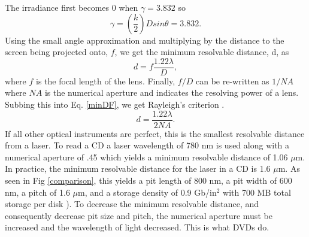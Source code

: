 \documentclass[ notitlepage, numerical, 11pt]{revtex4-1} %
\begin{document}
The irradiance first becomes 0 when $\gamma = 3.832$ \cite{optics} so 
\begin{equation}
\gamma = (\frac{k}{2})Dsin\theta = 3.832.
\label{gamma}
\end{equation}  
Using the small angle approximation and multiplying by the distance to the screen being projected onto, $f$, we get the minimum resolvable distance, d, as
\begin{equation}
d = f\frac{1.22\lambda}{D},
\label{minDF}
\end{equation}
where $f$ is the focal length of the lens. Finally, $f/D$ can be re-written as $1/NA$ where $NA$ is the numerical aperture and indicates the resolving power of a lens. Subbing this into Eq. \ref{minDF}, we get Rayleigh's criterion \cite{memory}.
\begin{equation}
d = \frac{1.22\lambda}{2NA}.
\label{rayleigh}
\end{equation}
If all other optical instruments are perfect, this is the smallest resolvable distance from a laser. To read a CD a laser wavelength of 780 nm is used along with a numerical aperture of .45 which yields a minimum resolvable distance of 1.06 $\mu$m. In practice, the minimum resolvable distance for the laser in a CD is 1.6 $\mu$m. As seen in Fig \ref{comparison}, this yields a pit length of 800 nm, a pit width of 600 nm, a pitch of 1.6 $\mu$m, and a storage density of 0.9 Gb/in$^2$ with 700 MB total storage per disk \cite{wikiHolo}). To decrease the minimum resolvable distance, and consequently decrease pit size and pitch, the numerical aperture must be increased and the wavelength of light decreased. This is what DVDs do.
\end{document}
